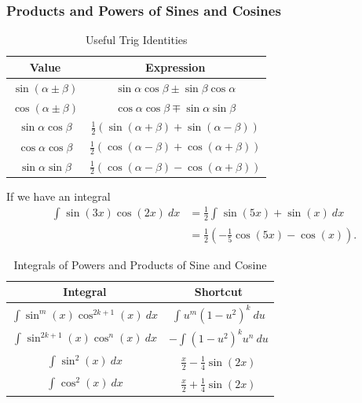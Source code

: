 \documentclass[10pt]{mypackage}
\begin{document}
\subsubsection{Products and Powers of Sines and Cosines}%
\begin{table}
  \centering
  \renewcommand{\arraystretch}{1.5}
  \begin{tabular}{c|c}
    Value & Expression\\
    \hline\hline
    $\sin\left(\alpha \pm \beta\right)$ & $\sin\alpha\cos\beta \pm \sin\beta\cos\alpha$\\
    $\cos\left(\alpha \pm \beta\right)$ & $\cos\alpha\cos\beta \mp \sin\alpha\sin\beta$\\
    \hline
    $\sin\alpha\cos\beta$ & $\frac{1}{2}\left(\sin(\alpha + \beta) + \sin\left(\alpha - \beta\right)\right)$\\
    $\cos\alpha\cos\beta$ & $\frac{1}{2}\left(\cos(\alpha - \beta) + \cos(\alpha + \beta)\right)$\\
    $\sin\alpha\sin\beta$ & $\frac{1}{2}\left(\cos(\alpha - \beta) - \cos(\alpha + \beta)\right)$
  \end{tabular}
  \caption{Useful Trig Identities}
\end{table}
\begin{example}
  If we have an integral
  \begin{align*}
    \int_{}^{} \sin(3x)\cos(2x)\:dx &= \frac{1}{2}\int_{}^{} \sin(5x) + \sin(x)\:dx\\
                                    &= \frac{1}{2}\left(-\frac{1}{5}\cos (5x) - \cos(x) \right).
  \end{align*}
\end{example}
\begin{table}
  \centering
  \renewcommand{\arraystretch}{1.5}
  \begin{tabular}{c|c}
    Integral & Shortcut\\
    \hline\hline
    $\int \sin^{m}(x)\cos^{2k+1}(x)\:dx$ & $\int_{}^{} u^{m}\left(1-u^2\right)^{k}\:du$\\
    $\int_{}^{} \sin^{2k+1}(x)\cos^{n}(x)\:dx$ & $-\int_{}^{} \left(1-u^2\right)^ku^{n}\:du$\\
    $\int_{}^{} \sin^{2}(x)\:dx$ & $\frac{x}{2} - \frac{1}{4}\sin(2x)$\\
    $\int_{}^{} \cos^{2}\left(x\right)\:dx$ & $\frac{x}{2} + \frac{1}{4}\sin(2x)$
  \end{tabular}
  \caption{Integrals of Powers and Products of Sine and Cosine}
\end{table}
\end{document}

